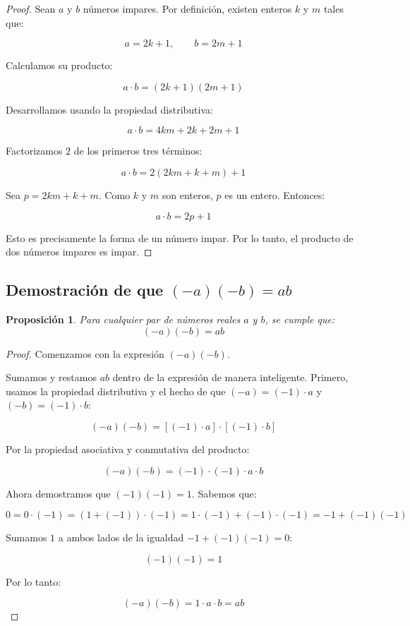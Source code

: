 \documentclass[12pt,final]{report}
\theoremstyle{plain}
\newtheorem{proposition}[theorem]{Proposición}
\theoremstyle{definition}
\begin{document}
\begin{proof}

Sean $a$ y $b$ números impares. Por definición, existen enteros $k$ y $m$ tales que:

\[
a = 2k + 1, \qquad b = 2m + 1
\]

Calculamos su producto:

\[
a \cdot b = (2k + 1)(2m + 1)
\]

Desarrollamos usando la propiedad distributiva:

\[
a \cdot b = 4km + 2k + 2m + 1
\]

Factorizamos $2$ de los primeros tres términos:

\[
a \cdot b = 2(2km + k + m) + 1
\]

Sea $p = 2km + k + m$. Como $k$ y $m$ son enteros, $p$ es un entero. Entonces:

\[
a \cdot b = 2p + 1
\]

Esto es precisamente la forma de un número impar. Por lo tanto, el producto de dos números impares es impar.

\end{proof}

\newpage

\subsection{Demostración de que $(-a)(-b) = ab$}

\begin{proposition}
Para cualquier par de números reales $a$ y $b$, se cumple que:
\[
(-a)(-b) = ab
\]
\end{proposition}

\begin{proof}

Comenzamos con la expresión $(-a)(-b)$.

Sumamos y restamos $ab$ dentro de la expresión de manera inteligente. Primero, usamos la propiedad distributiva y el hecho de que $(-a) = (-1) \cdot a$ y $(-b) = (-1) \cdot b$:

\[
(-a)(-b) = [(-1) \cdot a] \cdot [(-1) \cdot b]
\]

Por la propiedad asociativa y conmutativa del producto:

\[
(-a)(-b) = (-1) \cdot (-1) \cdot a \cdot b
\]

Ahora demostramos que $(-1)(-1) = 1$. Sabemos que:

\[
0 = 0 \cdot (-1) = (1 + (-1)) \cdot (-1) = 1 \cdot (-1) + (-1) \cdot (-1) = -1 + (-1)(-1)
\]

Sumamos $1$ a ambos lados de la igualdad $-1 + (-1)(-1) = 0$:

\[
(-1)(-1) = 1
\]

Por lo tanto:

\[
(-a)(-b) = 1 \cdot a \cdot b = ab
\]

\end{proof}
\end{document}
